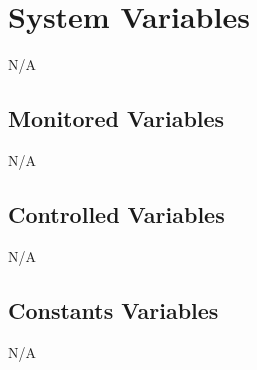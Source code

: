 \documentclass[12pt, titlepage]{article}
\begin{document}
\section{System Variables}

N/A

\subsection{Monitored Variables}
N/A
\subsection{Controlled Variables}
N/A
\subsection{Constants Variables}
N/A
\newpage
\end{document}
